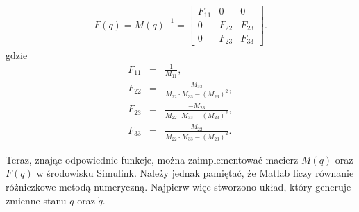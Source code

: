 \documentclass[eng,printmode]{mgr}
\begin{document}
 \begin{eqnarray}
F(q)=M(q)^{-1}= \left[
        \begin{array}{ccc}
         F_{11} & 0 & 0\\ 
         0 & F_{22}  & F_{23}\\
         0 & F_{23}  & F_{33}
         \end{array}
      \right].
\end{eqnarray}
gdzie
\begin{eqnarray}\label{row2.20}
F_{11} &= &\frac{1}{M_{11}},\\
F_{22} &= &\frac{M_{33}}{M_{22} \cdot M_{33} - (M_{23})^2},\nonumber \\
F_{23} &= &\frac{-M_{23}}{M_{22} \cdot M_{33} - (M_{23})^2},\nonumber \\
F_{33} &= &\frac{M_{22}}{M_{22} \cdot M_{33} - (M_{23})^2}.\nonumber
\end{eqnarray}


Teraz, znając odpowiednie funkcje, można zaimplementować macierz $M(q)$ oraz $F(q)$ w środowisku Simulink. Należy jednak pamiętać, że Matlab liczy równanie różniczkowe metodą numeryczną. Najpierw więc stworzono układ, który generuje zmienne stanu $q$ oraz $\dot{q}$.
  
\end{document}
